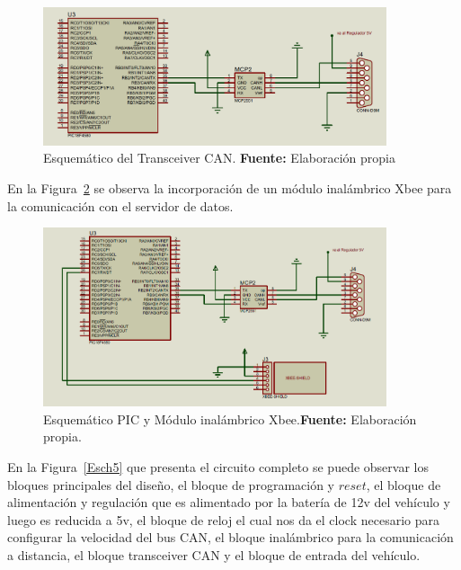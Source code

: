 \begin{figure}[H]
	\centering
		\includegraphics[width=0.9\textwidth]{./Cap4imagen/pic_y_mcp_4.png}
	\caption[Esquemático del Transceiver CAN.]{Esquemático del Transceiver CAN.\textbf{ Fuente:} 
		Elaboración propia}
	\label{Esch2} %
\end{figure}




En la Figura~\ref{Esch3} se observa la incorporación de un módulo inalámbrico Xbee para la comunicación con el servidor de datos. 


\begin{figure}[H]
	\centering
		\includegraphics[width=0.9\textwidth]{./Cap4imagen/xbee_4.png}
	\caption[Esquemático PIC y Módulo inalámbrico Xbee.]{Esquemático PIC y Módulo inalámbrico Xbee.\textbf{Fuente:} Elaboración propia.}
	\label{Esch3} %
\end{figure}



 En la Figura~\ref{Esch5} que presenta el circuito completo se puede observar los bloques principales del diseño, el bloque de programación y $reset$, el bloque de alimentación y regulación que es alimentado por la batería de 12v del vehículo y luego es reducida a 5v, el bloque de reloj el cual nos da el clock necesario para configurar la velocidad del bus CAN, el bloque inalámbrico para la comunicación a distancia, el bloque transceiver CAN y el bloque de entrada del vehículo. 
 

